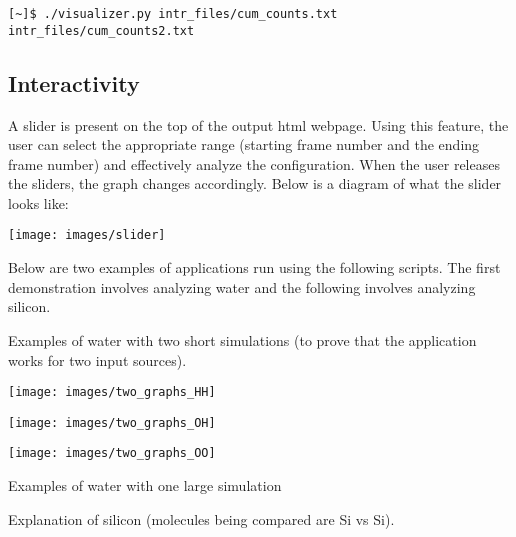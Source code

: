 \begin{verbatim}
[~]$ ./visualizer.py intr_files/cum_counts.txt intr_files/cum_counts2.txt 
\end{verbatim}


\subsection*{Interactivity}

A slider is present on the top of the output html webpage. Using this feature, the user can select the appropriate range (starting frame number and the ending frame number) and effectively analyze the configuration. When the user releases the sliders, the graph changes accordingly. Below is a diagram of what the slider looks like:


\texttt{[image: images/slider]}



Below are two examples of applications run using the following scripts. The first demonstration involves analyzing water and the following involves analyzing silicon. 



Examples of water with two short simulations (to prove that the application works for two input sources).

\texttt{[image: images/two\_graphs\_HH]}

\texttt{[image: images/two\_graphs\_OH]}

\texttt{[image: images/two\_graphs\_OO]}



Examples of water with one large simulation




Explanation of silicon (molecules being compared are Si vs Si).


